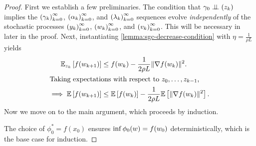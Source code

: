 \estimatingSequenceBound*
\begin{proof}
    First we establish a few preliminaries.
    The condition that \( \gamma_0 \perp \!\!\! \perp \left(z_{k}\right) \) implies the \( \left(\gamma_k\right)_{k=0}^\infty \), \( \left(\alpha_k\right)_{k=0}^\infty \), and \( \left(\lambda_k\right)_{k=0}^\infty \) sequences evolve \emph{independently} of the stochastic processes \( \left(y_k\right)_{k=0}^\infty \), \( \left(w_k\right)_{k=0}^\infty \), and \( \left(v_k\right)_{k=0}^\infty \).
    This will be necessary in later in the proof.
    Next, instantiating \autoref{lemma:sgc-decrease-condition} with \( \eta = \frac{1}{\rho L} \) yields
    \begin{align}
        \mathbb{E}_{z_{k}} \left[f(w_{k+1})\right] &\leq f(w_k) - \frac{1}{2 \rho L} \|\nabla f(w_k)\|^2.\nonumber\\
            \intertext{Taking expectations with respect to \( z_0, \ldots, z_{k-1} \),}
        \implies \mathbb{E} \left[f(w_{k+1})\right] &\leq \mathbb{E}\left[f(w_k)\right] - \frac{1}{2 \rho L} \mathbb{E} \left[\|\nabla f(w_k)\|^2\right].\label{eq:expected-decrease}
    \end{align}
    Now we move on to the main argument, which proceeds by induction.\hfill \break

    The choice of \( \phi^*_0 = f(x_0) \) ensures \( \inf \phi_0(w) = f(w_0) \) deterministically, which is the base case for induction.\hfill \break


\end{proof}

